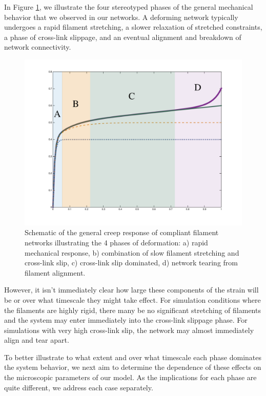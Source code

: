 \documentclass[pre,reprint]{revtex4-1}
\begin{document}
In Figure \ref{fig:shear_modes}, we illustrate the four stereotyped phases of the general mechanical behavior that we observed in our networks.  A deforming network typically undergoes a rapid filament stretching, a slower relaxation of stretched constraints, a phase of cross-link slippage, and an eventual alignment and breakdown of network connectivity.

\begin{figure}[h!]
\centering
\includegraphics[width=\hsize]{shear_modes}
\caption{\label{fig:shear_modes}Schematic of the general creep response of compliant filament networks illustrating the 4 phases of deformation: a) rapid mechanical response, b) combination of slow filament stretching and cross-link slip, c) cross-link slip dominated, d) network tearing from filament alignment.}
\end{figure}

However, it isn't immediately clear how large these components of the strain will be or over what timescale they might take effect.  For simulation conditions where the filaments are highly rigid, there many be no significant stretching of filaments and the system may enter immediately into the cross-link slippage phase.  For simulations with very high cross-link slip, the network may almost immediately align and tear apart.

To better illustrate to what extent and over what timescale each phase dominates the system behavior, we next aim to determine the dependence of these effects on the microscopic parameters of our model.  As the implications for each phase are quite different, we address each case separately.
\end{document}
